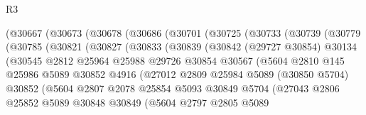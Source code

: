 \begin{lexlean}{R3}
\begin{coremodule}
            (@30667
              (@30673
                (@30678
                  (@30686
                    (@30701
                      (@30725
                        (@30733
                          (@30739
                            (@30779
                              (@30785
                                (@30821
                                  (@30827
                                    (@30833
                                      (@30839
                                        (@30842
                                          (@29727 @30854)
                                          @30134
                                          (@30545
                                            @2812
                                            @25964
                                            @25988
                                            @29726
                                            @30854
                                            @30567
                                            (@5604
                                              @2810
                                              @145
                                              @25986
                                              @5089
                                              @30852
                                              @4916
                                              (@27012
                                                @2809
                                                @25984
                                                @5089
                                                (@30850 @5704)
                                                @30852
                                                (@5604
                                                  @2807
                                                  @2078
                                                  @25854
                                                  @5093
                                                  @30849
                                                  @5704
                                                  (@27043
                                                    @2806
                                                    @25852
                                                    @5089
                                                    @30848
                                                    @30849
                                                    (@5604
                                                      @2797
                                                      @2805
                                                      @5089

\end{coremodule}
\end{lexlean}
